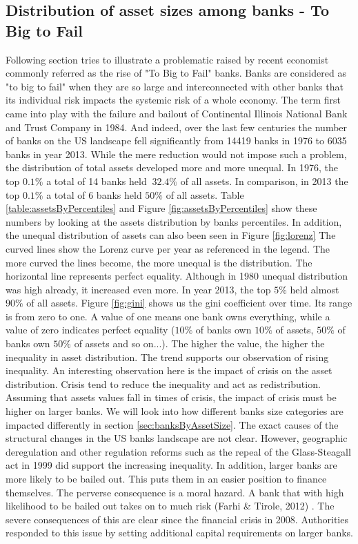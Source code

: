 \documentclass[12pt, a4paper]{article} %
\begin{document}
\newpage

\subsection{Distribution of asset sizes among banks - To Big to Fail}
\label{sec:ToBigToFail}

Following section tries to illustrate a problematic raised by recent economist commonly referred as the rise of "To Big to Fail" banks. 
Banks are considered as "to big to fail" when they are so large and interconnected with other banks that its individual risk impacts the systemic risk of a whole economy. The term first came into play with the failure and bailout of Continental Illinois National Bank and Trust Company in 1984.  
And indeed, over the last few centuries the number of banks on the US landscape fell significantly from 14419 banks in 1976 to 6035 banks in year 2013. While the mere reduction would not impose such a problem, the distribution of total assets developed more and more unequal. In 1976, the top $0.1\%$ a total of 14 banks held $~32.4\%$ of all assets. In comparison, in 2013 the top $0.1\%$ a total of 6 banks held $50\%$ of all assets. Table \ref{table:assetsByPercentiles} and Figure \ref{fig:assetsByPercentiles} show these numbers by looking at the assets distribution by banks percentiles. In addition, the unequal distribution of assets can also been seen in Figure \ref{fig:lorenz} The curved lines show the Lorenz curve per year as referenced in the legend. The more curved the lines become, the more unequal is the distribution. The horizontal line represents perfect equality. Although in 1980 unequal distribution was high already, it increased even more. In year 2013, the top $5\%$ held almost $90\%$ of all assets. Figure \ref{fig:gini} shows us the gini coefficient over time. Its range is from zero to one. A value of one means one bank owns everything, while a value of zero indicates perfect equality ($10\%$ of banks own $10\%$ of assets, $50\%$ of banks own $50\%$ of assets and so on...). The higher the value, the higher the inequality in asset distribution. The trend supports our observation of rising inequality. An interesting observation here is the impact of crisis on the asset distribution. Crisis tend to reduce the inequality and act as redistribution. Assuming that assets values fall in times of crisis, the impact of crisis must be higher on larger banks. We will look into how different banks size categories are impacted differently in section \ref{sec:banksByAssetSize}.
The exact causes of the structural changes in the US banks landscape are not clear. However, geographic deregulation and other regulation reforms such as the repeal of the Glass-Steagall act in 1999 did support the increasing inequality. In addition, larger banks are more likely to be bailed out. This puts them in an easier position to finance themselves. The perverse consequence is a moral hazard. A bank that with high likelihood to be bailed out takes on to much risk (Farhi \& Tirole, 2012) . The severe consequences of this are clear since the financial crisis in 2008. Authorities responded to this issue by setting additional capital requirements on larger banks. 
\end{document}
